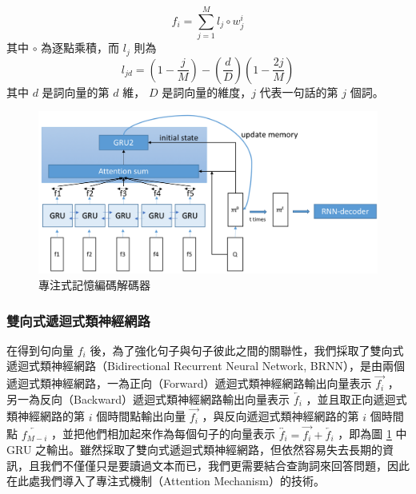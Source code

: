 \begin{equation}
    f_i = \sum_{j=1}^M l_j \circ w_j^i
\end{equation}
其中 $\circ$ 為逐點乘積，而 $l_j$ 則為
\begin{equation}
    l_{jd} = (1 - \frac{j}{M}) - (\frac{d}{D})(1 - \frac{2j}{M}) \label{PE}
\end{equation}
其中 $d$ 是詞向量的第 $d$ 維， $D$ 是詞向量的維度，$j$ 代表一句話的第 $j$ 個詞。

\begin{figure}[h]
    \centering
    \includegraphics[scale=0.54]{images/chap3_dmn.png}
    \caption{專注式記憶編碼解碼器}\label{fig:dmn}
\end{figure}
\subsubsection{雙向式遞迴式類神經網路}
在得到句向量 $f_i$ 後，為了強化句子與句子彼此之間的關聯性，我們採取了雙向式遞迴式類神經網路（Bidirectional Recurrent Neural Network, BRNN），是由兩個遞迴式類神經網路，一為正向（Forward）遞迴式類神經網路輸出向量表示 $\overrightarrow{f_i}$ ，另一為反向（Backward）遞迴式類神經網路輸出向量表示 $\overleftarrow{f_i}$ ，並且取正向遞迴式類神經網路的第 $i$ 個時間點輸出向量 $\overrightarrow{f_i}$ ，與反向遞迴式類神經網路的第 $i$ 個時間點 $\overleftarrow{f_{M-i}}$ ，並把他們相加起來作為每個句子的向量表示 $\overleftrightarrow{f_i} = \overrightarrow{f_i} + \overleftarrow{f_i}$ ，即為圖 \ref{fig:dmn} 中 GRU 之輸出。雖然採取了雙向式遞迴式類神經網路，但依然容易失去長期的資訊，且我們不僅僅只是要讀過文本而已，我們更需要結合查詢詞來回答問題，因此在此處我們導入了專注式機制（Attention Mechanism）的技術。


